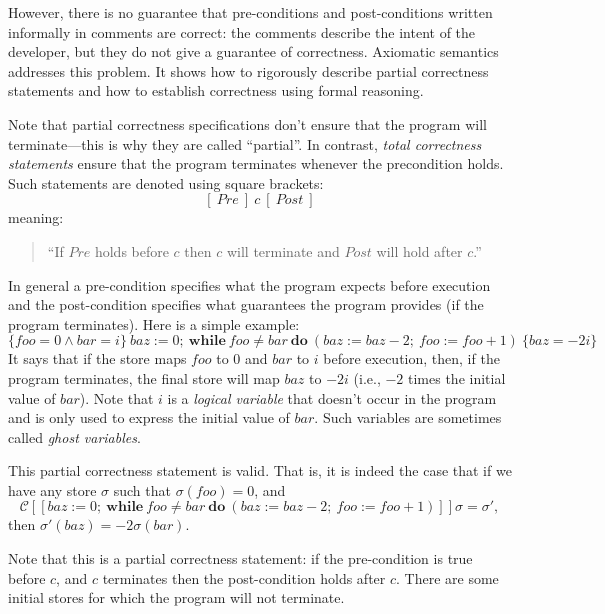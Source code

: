 However, there is no guarantee that pre-conditions and post-conditions written informally in
comments are correct: the comments describe the intent of the developer, but they do not give a
guarantee of correctness. Axiomatic semantics addresses this problem. It shows how to
rigorously describe partial correctness statements and how to establish correctness using
formal reasoning.

Note that partial correctness specifications don't ensure that the program will
terminate---this is why they are called ``partial''. In contrast, \emph{total correctness
statements} ensure that the program terminates whenever the precondition holds. Such statements
are denoted using square brackets:
\[
[\ \mathit{Pre}\ ]\ c\ [\ \mathit{Post}\ ]
\]
meaning:
\begin{quote}
``If $\mathit{Pre}$ holds before $c$ then $c$ will terminate and $\mathit{Post}$ will hold after
$c$.''
\end{quote}

In general a pre-condition specifies what the program expects before execution and the
post-condition specifies what guarantees the program provides (if the program terminates). Here
is a simple example:
\[
\{\mathit{foo} = 0 \wedge \mathit{bar} = i\}\ \mathit{baz} := 0;\ \mathbf{while}\ \mathit{foo}
\neq \mathit{bar}\ \mathbf{do}\ (\mathit{baz} := \mathit{baz} - 2;\ \mathit{foo} := \mathit{foo}
+ 1)\ \{\mathit{baz} = -2i\}
\]
It says that if the store maps $\mathit{foo}$ to $0$ and $\mathit{bar}$ to $i$ before execution,
then, if the program terminates, the final store will map $\mathit{baz}$ to $-2i$ (i.e., $-2$
times the initial value of $\mathit{bar}$). Note that $i$ is a \emph{logical variable} that
doesn't occur in the program and is only used to express the initial value of $\mathit{bar}$.
Such variables are sometimes called \emph{ghost variables}.

This partial correctness statement is valid. That is, it is indeed the case that if we have any
store $\sigma$ such that $\sigma(\mathit{foo}) = 0$, and
\[
\mathcal{C}[\![\mathit{baz} := 0;\ \mathbf{while}\ \mathit{foo} \neq \mathit{bar}\
\mathbf{do}\ (\mathit{baz} := \mathit{baz} - 2;\ \mathit{foo} := \mathit{foo} + 1)]\!]\sigma =
\sigma',
\]
then $\sigma'(\mathit{baz}) = -2\sigma(\mathit{bar})$.

Note that this is a partial correctness statement: if the pre-condition is true before $c$, and
$c$ terminates then the post-condition holds after $c$. There are some initial stores for which
the program will not terminate.

